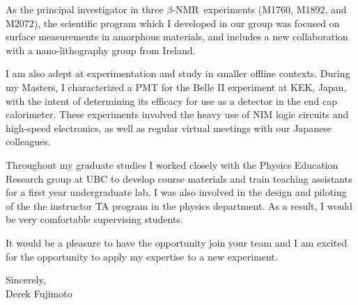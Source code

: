 \documentclass{simplehipstercv_cl}
\newcommand{\bnmr}{$\beta$-NMR}
\begin{document}
As the principal investigator in three \bnmr\ experiments (M1760, M1892, and M2072), the scientific program which I developed in our group was focused on surface measurements in amorphous materials, and includes a new collaboration with a nano-lithography group from Ireland.

I am also adept at experimentation and study in smaller offline contexts. During my Masters, I characterized a PMT for the Belle II experiment at KEK, Japan, with the intent of determining its efficacy for use as a detector in the end cap calorimeter. These experiments involved the heavy use of NIM logic circuits and high-speed electronics, as well as regular virtual meetings with our Japanese colleagues.

Throughout my graduate studies I worked closely with the Physics Education Research group at UBC to develop course materials and train teaching assistants for a first year undergraduate lab. I was also involved in the design and piloting of the the instructor TA program in the physics department. As a result, I would be very comfortable supervising students.

It would be a pleasure to have the opportunity join your team and I am excited for the opportunity to apply my expertise to a new experiment.

\vspace{0.5cm}
\raggedright
Sincerely,\\
\vspace{0.25cm}
Derek Fujimoto
\end{document}
